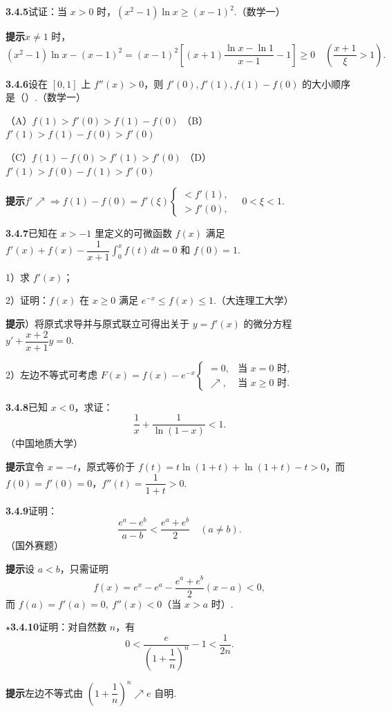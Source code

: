\documentclass[UTF8, 12pt, fontset=fandol, oneside]{ctexart}
\begin{document}
\noindent\textbf{3.4.5}\quad 试证：当 $x>0$ 时，$(x^2-1)\ln x\ge(x-1)^2$.（数学一）

\noindent\textbf{提示}\quad $x\ne1$ 时，
\[
  (x^2-1)\ln x-(x-1)^2
  =(x-1)^2\left[(x+1)\frac{\ln x-\ln1}{x-1}-1\right]\ge0
  \quad\left(\frac{x+1}{\xi}>1\right).
\]

\noindent\textbf{3.4.6}\quad 设在 $[0,1]$ 上 $f''(x)>0$，则 $f'(0),f'(1),f(1)-f(0)$ 的大小顺序是（\quad）.（数学一）

（A）$f(1)>f'(0)>f(1)-f(0)$ \qquad
（B）$f'(1)>f(1)-f(0)>f'(0)$

（C）$f(1)-f(0)>f'(1)>f'(0)$ \qquad
（D）$f'(1)>f(0)-f(1)>f'(0)$

\noindent\textbf{提示}\quad $f'\nearrow\Rightarrow f(1)-f(0)=f'(\xi)
\begin{cases}
<f'(1),\\
>f'(0),
\end{cases}\quad0<\xi<1.$

\noindent\textbf{3.4.7}\quad 已知在 $x>-1$ 里定义的可微函数 $f(x)$ 满足 $f'(x)+f(x)-\dfrac1{x+1}\int_0^x f(t)\,dt=0$ 和 $f(0)=1$.

1）求 $f'(x)$；

2）证明：$f(x)$ 在 $x\ge0$ 满足 $e^{-x}\le f(x)\le1$.（大连理工大学）

\noindent\textbf{提示}）将原式求导并与原式联立可得出关于 $y=f'(x)$ 的微分方程 $y'+\dfrac{x+2}{x+1}y=0$.

2）左边不等式可考虑 $F(x)=f(x)-e^{-x}
\begin{cases}
=0, & \text{当 }x=0\text{ 时},\\
\nearrow, & \text{当 }x\ge0\text{ 时}.
\end{cases}$

\noindent\textbf{3.4.8}\quad 已知 $x<0$，求证：
\[
  \frac1x+\frac1{\ln(1-x)}<1.
\]
（中国地质大学）

\noindent\textbf{提示}\quad 宜令 $x=-t$，原式等价于 $f(t)=t\ln(1+t)+\ln(1+t)-t>0$，而 $f(0)=f'(0)=0$，$f''(t)=\dfrac1{1+t}>0$.

\noindent\textbf{3.4.9}\quad 证明：
\[
  \frac{e^a-e^b}{a-b}<\frac{e^a+e^b}2\quad(a\ne b).
\]
（国外赛题）

\noindent\textbf{提示}\quad 设 $a<b$，只需证明
\[
  f(x)=e^x-e^a-\frac{e^a+e^b}2(x-a)<0,
\]
而 $f(a)=f'(a)=0,\ f''(x)<0$（当 $x>a$ 时）.

\noindent\textbf{$\star$3.4.10}\quad 证明：对自然数 $n$，有
\[
  0<\frac{e}{\left(1+\dfrac1n\right)^n}-1<\frac1{2n}.
\]

\noindent\textbf{提示}\quad 左边不等式由 $\left(1+\dfrac1n\right)^n\nearrow e$ 自明.
\end{document}
